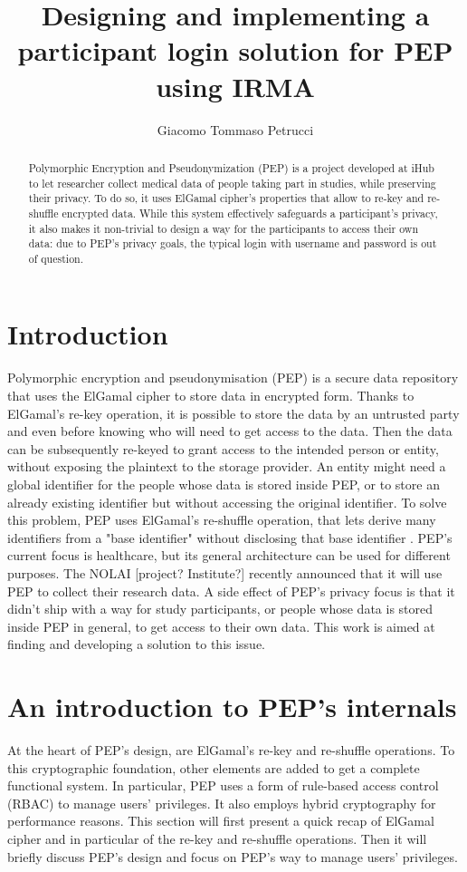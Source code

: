 \documentclass{report}
\begin{document}
\title{Designing and implementing a participant login solution for PEP using IRMA}
\author{Giacomo Tommaso Petrucci}
\maketitle

\begin{abstract}
	Polymorphic Encryption and Pseudonymization (PEP) is a project developed at iHub to let researcher collect medical data of people taking part in studies, while preserving their 
	privacy. To do so, it uses ElGamal cipher's properties that allow to re-key and re-shuffle encrypted data. While this system effectively safeguards a participant's privacy, it 
	also makes it non-trivial to design a way for the participants to access their own data: due to PEP's privacy goals, the typical login with username and password is out of
	question. 
\end{abstract}

\section{Introduction}
Polymorphic encryption and pseudonymisation (PEP) is a secure data repository that uses the ElGamal cipher to store data in encrypted form. Thanks to
ElGamal's re-key operation, it is possible to store the data by an untrusted party and even before knowing who will need to get access to the data. Then the data
can be subsequently re-keyed to grant access to the intended person or entity, without exposing the plaintext to the storage provider. An entity might need a global identifier for
the people whose data is stored inside PEP, or to store an already existing identifier but without accessing the original identifier. To solve this problem, PEP uses ElGamal's
re-shuffle operation, that lets derive many identifiers from a "base identifier" without disclosing that base identifier \cite{peppaper}. 
PEP's current focus is healthcare, but its general architecture can be used for different purposes. The NOLAI \cite{nolai} [project? Institute?] recently announced that it will use PEP to
collect their research data. \linebreak
A side effect of PEP's privacy focus is that it didn't ship with a way for study participants, or people whose data is stored inside PEP in general, to get access to their own data.
This work is aimed at finding and developing a solution to this issue.

\section{An introduction to PEP's internals}
At the heart of PEP's design, are ElGamal's re-key and re-shuffle operations. To this cryptographic foundation, other elements are added to get a complete functional system. In
particular, PEP uses a form of rule-based access control (RBAC) to manage users' privileges. It also employs hybrid cryptography for performance reasons. This section will first
present a quick recap of ElGamal cipher and in particular of the re-key and re-shuffle operations. Then it will briefly discuss PEP's design and focus on PEP's way to manage users'
privileges.
\end{document}
